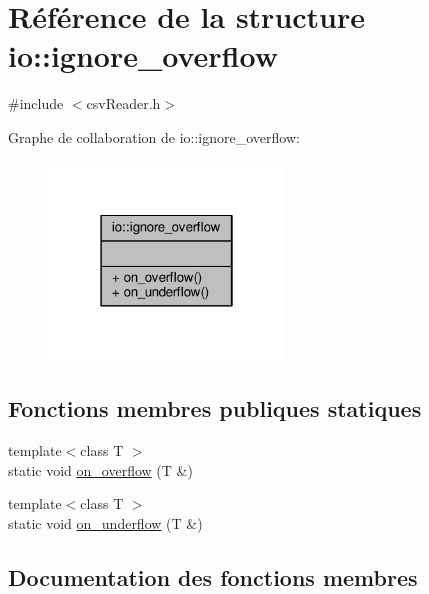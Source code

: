 \hypertarget{structio_1_1ignore__overflow}{}\section{Référence de la structure io\+:\+:ignore\+\_\+overflow}
\label{structio_1_1ignore__overflow}


{\ttfamily \#include $<$csv\+Reader.\+h$>$}



Graphe de collaboration de io\+:\+:ignore\+\_\+overflow\+:\nopagebreak
\begin{figure}[H]
\begin{center}
\leavevmode
\includegraphics[width=178pt]{structio_1_1ignore__overflow__coll__graph}
\end{center}
\end{figure}
\subsection*{Fonctions membres publiques statiques}
\begin{DoxyCompactItemize}
\item 
{\footnotesize template$<$class T $>$ }\\static void \hyperlink{structio_1_1ignore__overflow_aed3e5026cfa7157ea9270ae377d1026b}{on\+\_\+overflow} (T \&)
\item 
{\footnotesize template$<$class T $>$ }\\static void \hyperlink{structio_1_1ignore__overflow_aece692f7a20933149ec99aa1f97458ad}{on\+\_\+underflow} (T \&)
\end{DoxyCompactItemize}


\subsection{Documentation des fonctions membres}
\mbox{\label{structio_1_1ignore__overflow_aed3e5026cfa7157ea9270ae377d1026b}} 
